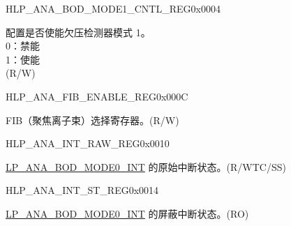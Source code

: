 \begin{register}{H}{LP\_ANA\_BOD\_MODE1\_CNTL\_REG}{0x0004}
\label{regdesc:LPANABODMODE1CNTLREG}
%
%
\regnewline%
\begin{regdesc}\begin{reglist}
\label{fielddesc:LPANABODMODE1RESETENA}\item [LP\_ANA\_BOD\_MODE1\_RESET\_ENA]  配置是否使能欠压检测器模式 1。\\
0：禁能\\
1：使能\\
(R/W)
\end{reglist}\end{regdesc}
\end{register}


\begin{register}{H}{LP\_ANA\_FIB\_ENABLE\_REG}{0x000C}\label{regdesc:LPANAFIBENABLEREG}
%
\regnewline%
\begin{regdesc}\begin{reglist}
\label{fielddesc:LPANAANAFIBENA}\item [LP\_ANA\_ANA\_FIB\_ENA]  FIB（聚焦离子束）选择寄存器。(R/W)
\end{reglist}\end{regdesc}
\end{register}

\begin{register}{H}{LP\_ANA\_INT\_RAW\_REG}{0x0010}\label{regdesc:LPANAINTRAWREG}
%
%
\regnewline%
\begin{regdesc}\begin{reglist}
\label{fielddesc:LPANABODMODE0INTRAW}\item [LP\_ANA\_BOD\_MODE0\_INT\_RAW] \hyperref[int:LPANABODMODE0INT]{LP\_ANA\_BOD\_MODE0\_INT} 的原始中断状态。(R/WTC/SS)
\end{reglist}\end{regdesc}
\end{register}

\begin{register}{H}{LP\_ANA\_INT\_ST\_REG}{0x0014}\label{regdesc:LPANAINTSTREG}
%
%
\regnewline%
\begin{regdesc}\begin{reglist}
\label{fielddesc:LPANABODMODE0INTST}\item [LP\_ANA\_BOD\_MODE0\_INT\_ST] \hyperref[int:LPANABODMODE0INT]{LP\_ANA\_BOD\_MODE0\_INT} 的屏蔽中断状态。(RO)
\end{reglist}\end{regdesc}
\end{register}


